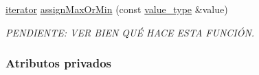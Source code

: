 \begin{Indent}
\begin{DoxyCompactItemize}
\hyperlink{classaed2_1_1map_1_1iterator}{iterator} \hyperlink{classaed2_1_1map_a50aae07014200a53b95394f349f55948_a50aae07014200a53b95394f349f55948}{assign\+Max\+Or\+Min} (const \hyperlink{classaed2_1_1map_a719db98e0ff9a837610f76be33264680_a719db98e0ff9a837610f76be33264680}{value\+\_\+type} \&value)
\begin{DoxyCompactList}\small\item\em P\+E\+N\+D\+I\+E\+N\+TE\+: V\+ER B\+I\+EN Q\+UÉ H\+A\+CE E\+S\+TA F\+U\+N\+C\+IÓN. \end{DoxyCompactList}\end{DoxyCompactItemize}
\end{Indent}
\subsubsection*{Atributos privados}
